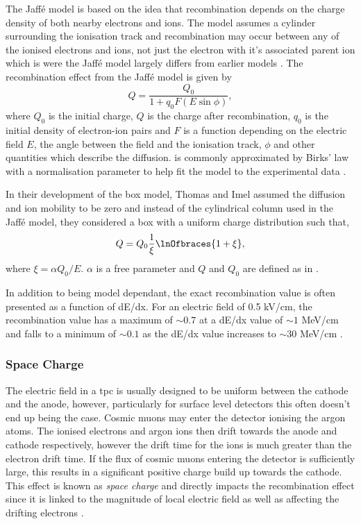 The Jaff\'{e} model is based on the idea that recombination depends on the charge density of both nearby electrons and ions. The model assumes a cylinder surrounding the ionisation track and recombination may occur between any of the ionised electrons and ions, not just the electron with it's associated parent ion which is were the Jaff\'{e} model largely differs from earlier models \cite{Jaffe_model}. The recombination effect from the Jaff\'{e} model is given by 
\begin{equation}\label{Jaffe}
    Q = \frac{Q_{0}}{1+q_{0}F(E\sin{\phi})},
\end{equation}
where $Q_0$ is the initial charge, $Q$ is the charge after recombination, $q_0$ is the initial density of electron-ion pairs and $F$ is a function depending on the electric field $E$, the angle between the field and the ionisation track, $\phi$ and other quantities which describe the diffusion.  is commonly approximated by Birks' law with a normalisation parameter to help fit the model to the experimental data \cite{LArTPC_book}. 

In their development of the box model, Thomas and Imel assumed the diffusion and ion mobility to be zero and instead of the cylindrical column used in the Jaff\'{e} model, they considered a box with a uniform charge distribution such that, 
\begin{equation}
    Q = Q_{0}\frac{1}{\xi}\lnOfbraces{1+\xi},
\end{equation}
where $\xi = \alpha Q_0/E$. $\alpha$ is a free parameter and $Q$ and $Q_0$ are defined as in \cite{LArTPC_book}\cite{Recombination_box_model}.

In addition to being model dependant, the exact recombination value is often presented as a function of dE/dx. For an electric field of 0.5 kV/cm, the recombination value has a maximum of $\sim0.7$ at a dE/dx value of $\sim1$ MeV/cm and falls to a minimum of $\sim0.1$ as the dE/dx value increases to $\sim30$ MeV/cm \cite{LArTPC_book}.

\subsubsection{Space Charge}
The electric field in a \gls{tpc} is usually designed to be uniform between the cathode and the anode, however, particularly for surface level detectors this often doesn't end up being the case. Cosmic muons may enter the detector ionising the argon atoms. The ionised electrons and argon ions then drift towards the anode and cathode respectively, however the drift time for the ions is much greater than the electron drift time. If the flux of cosmic muons entering the detector is sufficiently large, this results in a significant positive charge build up towards the cathode. This effect is known as \textit{space charge} and directly impacts the recombination effect since it is linked to the magnitude of local electric field as well as affecting the drifting electrons \cite{microboone_sce}.

